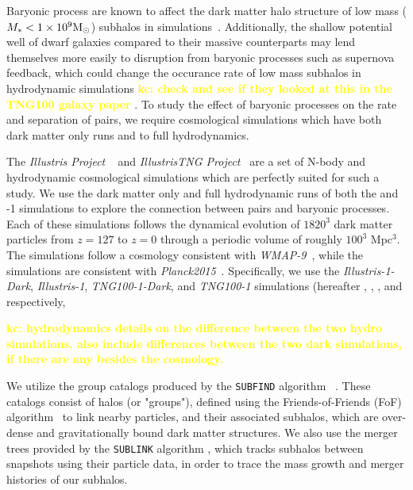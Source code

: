 \documentclass[twocolumn]{aastex631}
\newcommand{\kc}[1]{\textcolor{yellow}{\textbf{kc: #1}} }
\begin{document}
Baryonic process are known to affect the dark matter halo structure of low mass ($M_*<1\times10^9\mathrm{M}_\odot$) subhalos in simulations~\citep[see e.g.][and references therein]{Sales:2022}.
Additionally, the shallow potential well of dwarf galaxies compared to their massive counterparts may lend themselves more easily to disruption from baryonic processes such as supernova feedback, which could change the occurance rate of low mass subhalos in hydrodynamic simulations \kc{check and see if they looked at this in the TNG100 galaxy paper}.
To study the effect of baryonic processes on the rate and separation of pairs, we require cosmological simulations which have both dark matter only runs and to full hydrodynamics.

The \textit{Illustris Project} ~\citep{vogelsberger14A,nelson15} and \textit{IllustrisTNG Project}~\citep{TNG1, TNG2, TNG3, TNG4, TNG5} are a set of N-body and hydrodynamic cosmological simulations which are perfectly suited for such a study. 
We use the dark matter only and full hydrodynamic runs of both the  and -1 simulations to explore the connection between pairs and baryonic processes. 
Each of these simulations follows the dynamical evolution of $1820^3$ dark matter particles from $z=127$ to $z=0$ through a periodic volume of roughly $100^3$ Mpc$^3$. 
The \ill{} simulations follow a cosmology consistent with \textit{WMAP-9}~\citep{hinshaw2013}, while the \tng{} simulations are consistent with \textit{Planck2015}~\citep{Planck2015}.
Specifically, we use the \textit{Illustris-1-Dark}, \textit{Illustris-1}, \textit{TNG100-1-Dark}, and \textit{TNG100-1} simulations (hereafter \illd, \illh, \tngd, and \tngh{} respectively, %

\kc{hydrodynamics details on the difference between the two hydro simulations. also include differences between the two dark simulations, if there are any besides the cosmology. }

We utilize the group catalogs produced by the \texttt{SUBFIND} algorithm ~\citep{springel2001,dolag09}. 
These catalogs consist of halos (or "groups"), defined using the Friends-of-Friends (FoF) algorithm~\citep{davis1985} to link nearby particles, and their associated subhalos, which are over-dense and gravitationally bound dark matter structures.
We also use the merger trees provided by the \texttt{SUBLINK} algorithm \citep{gomez15}, which tracks subhalos between snapshots using their particle data, in order to trace the mass growth and merger histories of our subhalos.
\end{document}
